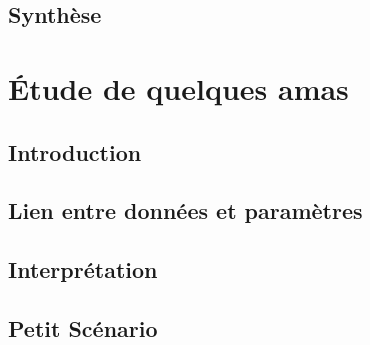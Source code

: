 	\section{Synthèse}
		

\chapter{Étude de quelques amas}
	\minitoc
	\section{Introduction}
		

	\section[Lien]{Lien entre données et paramètres\label{amas}}
		

	\section{Interprétation}
		

	\section{Petit Scénario\label{petit_scenar}}
		

